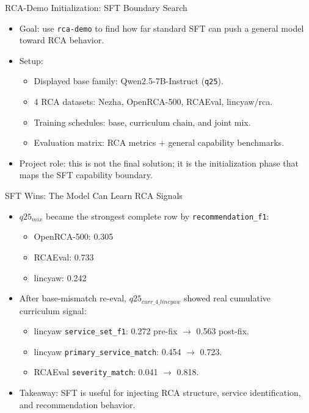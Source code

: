 \begin{frame}{RCA-Demo Initialization: SFT Boundary Search}
  \begin{itemize}
    \item Goal: use \texttt{rca-demo} to find how far standard SFT can push a general model toward RCA behavior.
    \item Setup:
      \begin{itemize}
        \item Displayed base family: Qwen2.5-7B-Instruct (\texttt{q25}).
        \item 4 RCA datasets: Nezha, OpenRCA-500, RCAEval, lincyaw/rca.
        \item Training schedules: base, curriculum chain, and joint mix.
        \item Evaluation matrix: RCA metrics + general capability benchmarks.
      \end{itemize}
    \item Project role: this is not the final solution; it is the initialization phase that maps the SFT capability boundary.
  \end{itemize}
\end{frame}

\begin{frame}{SFT Wins: The Model Can Learn RCA Signals}
  \begin{itemize}
    \item $q25_{mix}$ became the strongest complete row by \texttt{recommendation\_f1}:
      \begin{itemize}
        \item OpenRCA-500: 0.305
        \item RCAEval: 0.733
        \item lincyaw: 0.242
      \end{itemize}
    \item After base-mismatch re-eval, $q25_{curr\_4\_lincyaw}$ showed real cumulative curriculum signal:
      \begin{itemize}
        \item lincyaw \texttt{service\_set\_f1}: 0.272 pre-fix $\rightarrow$ 0.563 post-fix.
        \item lincyaw \texttt{primary\_service\_match}: 0.454 $\rightarrow$ 0.723.
        \item RCAEval \texttt{severity\_match}: 0.041 $\rightarrow$ 0.818.
      \end{itemize}
    \item Takeaway: SFT is useful for injecting RCA structure, service identification, and recommendation behavior.
  \end{itemize}
\end{frame}

